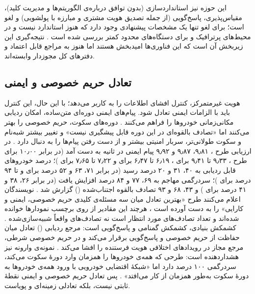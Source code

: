 \documentclass[12pt,a4paper]{article}
\begin{document}
این حوزه نیز استانداردسازی (بدون توافق درباره‌ی الگوریتم‌ها و مدیریت کلید)، مقیاس‌پذیری، پاسخ‌گویی (از جمله تصدیق هویت مشتری و مبارزه با پولشویی) و لغو است؛ برای لغو تنها یک مشخصات پیشنهادی وجود دارد که هنوز استاندارد  نیست و در محیط‌های پرترافیک و برای دستگاه‌های محدود کمتر بررسی شده است \cite{mazzocca2025survey}. نتیجه‌گیری این زیربخش آن است که این فناوری‌ها امیدبخش هستند اما هنوز به مراجع قابل اعتماد و دفتر‌های کل مجوزدار وابسته‌اند.

\subsection{تعادل حریم خصوصی و ایمنی}

هویت غیرمتمرکز، کنترل افشای اطلاعات را به کاربر می‌دهد؛ با این حال، این کنترل باید با الزامات ایمنی تعادل شود. پیام‌های ایمنی دوره‌ای متن‌ساده، امکان ردیابی مکانی‌زمانی خودرو‌ها را فراهم می‌کنند \cite{al-aniPrivacySafetyImprovement2023}. دوره‌های سکوت، حریم خصوصی را بهتر می‌کنند اما «تصادف بالقوه‌ای در این دوره قابل پیشگیری نیست» \cite{al-aniPrivacySafetyImprovement2023} و تغییر بیشتر شبه‌نام و سکوت طولانی‌تر، سربار امنیتی بیشتر و از دست رفتن پیام‌ها را به دنبال دارد \cite{al-aniPrivacySafetyImprovement2023}. در ارزیابی طرح ، ۹٫۸۱، ۹٫۸۷ و ۹٫۹۲ پیام ایمنی در ثانیه به دست آمد (در برابر ۱۰٫۰۰ برای طرح ، ۹٫۳۳ تا ۹٫۴۱ برای ، ۶٫۱۹ تا ۶٫۴۷ برای  و ۷٫۲۲ تا ۷٫۶۵ برای )؛ درصد خودرو‌های قابل ردیابی به ۴۰، ۳۱ و ۲۰ درصد رسید (در برابر ۷۱، ۶۳ و ۵۲ درصد برای  و تا ۹۴ درصد برای )؛ سردرگمی مهاجم به ۶۹، ۷۷ و ۸۴ درصد افزایش یافت (در برابر ۲۶، ۳۸ و ۴۱ درصد برای ) و ۴۳، ۶۸ و ۹۳ تصادف بالقوه اجتناب‌شده () گزارش شد \cite{al-aniPrivacySafetyImprovement2023}. نویسندگان اعلام می‌کنند طرح  «بهترین تعادل میان سه مسئله‌ی کلیدی حریم خصوصی، ایمنی و کارایی» را به دست آورده است \cite{al-aniPrivacySafetyImprovement2023}، هرچند این مقادیر از روی برچسب نمودار‌ها خوانده شده‌اند و  تعداد تصادف‌های مورد انتظار است نه تصادف‌های واقعاً شبیه‌سازی‌شده \cite{al-aniPrivacySafetyImprovement2023}. کشمکش بنیادی، کشمکش گمنامی و پاسخ‌گویی است: مرجع ردیابی () تعادل میان حفاظت از حریم خصوصی و پاسخ‌گویی برقرار می‌کند \cite{rahmawatiagustinaSystematicLiteratureReview2025} و در حریم خصوصی شرطی، مرجع مجاز در رویداد‌های اختلافی هویت فرستنده را افشا می‌کند \cite{linGSISSecurePrivacyPreserving2007, luPseudonymChangingSocial2012}. نمونه‌ی وارونه نیز هشداردهنده است: طرحی که همه‌ی خودرو‌ها را همزمان وارد دورهٔ سکوت می‌کند، سردرگمی ۱۰۰ درصد دارد اما «شبکهٔ اقتضایی خودرویی با ورود همه‌ی خودرو‌ها به دورهٔ سکوت به‌طور همزمان از کار می‌افتد» \cite{al-aniPrivacySafetyImprovement2023}. پس تعادل حریم خصوصی و ایمنی نقطهٔ ثابتی نیست، بلکه تعادلی زمینه‌ای و پویاست.
\end{document}
